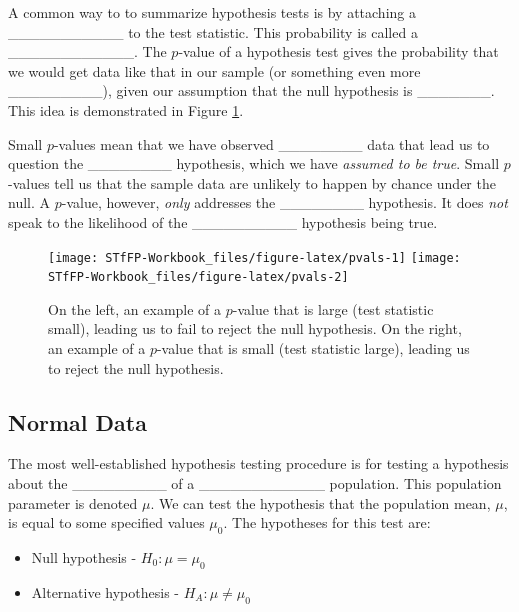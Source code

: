\documentclass[]{book}
\providecommand{\tightlist}{%
  \setlength{\itemsep}{0pt}\setlength{\parskip}{0pt}}
\theoremstyle{definition}
\theoremstyle{definition}
\theoremstyle{remark}
\begin{document}
A common way to to summarize hypothesis tests is by attaching a
\_\_\_\_\_\_\_\_\_\_\_ to the test statistic. This probability is called
a \_\_\_\_\_\_\_\_\_\_\_\_. The \(p\)-value of a hypothesis test gives
the probability that we would get data like that in our sample (or
something even more \_\_\_\_\_\_\_\_\_), given our assumption that the
null hypothesis is \_\_\_\_\_\_\_. This idea is demonstrated in Figure
\ref{fig:pvals}.

Small \(p\)-values mean that we have observed \_\_\_\_\_\_\_\_ data that
lead us to question the \_\_\_\_\_\_\_\_ hypothesis, which we have
\emph{assumed to be true}. Small \(p\)-values tell us that the sample
data are unlikely to happen by chance under the null. A \(p\)-value,
however, \emph{only} addresses the \_\_\_\_\_\_\_\_ hypothesis. It does
\emph{not} speak to the likelihood of the \_\_\_\_\_\_\_\_\_\_
hypothesis being true.

\begin{figure}[h]

{\centering \texttt{[image: STfFP-Workbook\_files/figure-latex/pvals-1]} \texttt{[image: STfFP-Workbook\_files/figure-latex/pvals-2]} 

}

\caption{On the left, an example of a $p$-value that is large (test statistic small), leading us to fail to reject the null hypothesis. On the right, an example of a $p$-value that is small (test statistic large), leading us to reject the null hypothesis.}\label{fig:pvals}
\end{figure}

\subsection{Normal Data}\label{normal-data}

The most well-established hypothesis testing procedure is for testing a
hypothesis about the \_\_\_\_\_\_\_\_\_ of a \_\_\_\_\_\_\_\_\_\_\_\_
population. This population parameter is denoted \(\mu\). We can test
the hypothesis that the population mean, \(\mu\), is equal to some
specified values \(\mu_0\). The hypotheses for this test are:

\begin{itemize}
\tightlist
\item
  Null hypothesis - \(H_0 : \mu = \mu_0\) \vspace{.1in}
\item
  Alternative hypothesis - \(H_A : \mu \neq \mu_0\)
\end{itemize}
\end{document}
